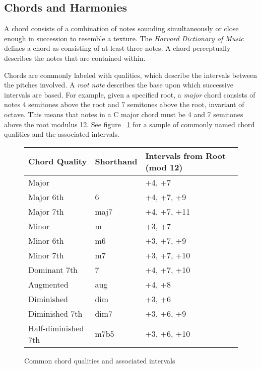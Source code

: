 \subsection{Chords and Harmonies}

A chord consists of a combination of notes sounding simultaneously or close enough in succession to resemble a texture. The \textit{Harvard Dictionary of Music} defines a chord as consisting of at least three notes\cite{harvdict}. A chord perceptually describes the notes that are contained within.

Chords are commonly labeled with qualities, which describe the intervals between the pitches involved. A \textit{root note} describes the base upon which successive intervals are based. For example, given a specified root, a \textit{major} chord consists of notes 4 semitones above the root and 7 semitones above the root, invariant of octave. This means that notes in a C major chord must be 4 and 7 semitones above the root modulus 12. See figure ~\ref{fig:qualitytable} for a sample of commonly named chord qualities and the associated intervals.

\begin{figure}[h!]
\begin{center}
\begin{tabular}{lll}
\toprule
Chord Quality       & Shorthand & Intervals from Root (mod 12) \\
\midrule
Major               &           & +4, +7     \\
Major 6th           & 6         & +4, +7, +9 \\
Major 7th           & maj7      & +4, +7, +11\\
Minor               & m         & +3, +7     \\
Minor 6th           & m6        & +3, +7, +9 \\
Minor 7th           & m7        & +3, +7, +10\\
Dominant 7th        & 7         & +4, +7, +10\\
Augmented           & aug       & +4, +8     \\
Diminished          & dim       & +3, +6     \\
Diminished 7th      & dim7      & +3, +6, +9 \\
Half-diminished 7th & m7b5      & +3, +6, +10\\
\bottomrule
\end{tabular}
\caption{Common chord qualities and associated intervals}
\label{fig:qualitytable}
\end{center}
\end{figure}

